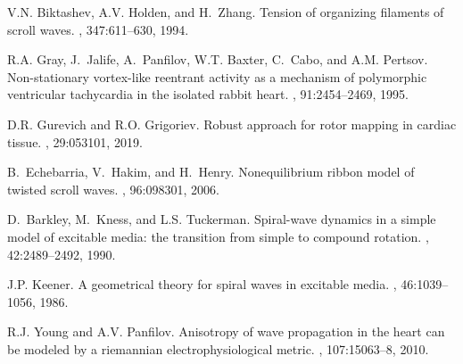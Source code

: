 \documentclass{article}
\begin{document}
\begin{thebibliography}{10}
V.N. Biktashev, A.V. Holden, and H.~Zhang.
\newblock Tension of organizing filaments of scroll waves.
, 347:611--630, 1994.

R.A. Gray, J.~Jalife, A.~Panfilov, W.T. Baxter, C.~Cabo, and A.M. Pertsov.
\newblock Non-stationary vortex-like reentrant activity as a mechanism of
  polymorphic ventricular tachycardia in the isolated rabbit heart.
, 91:2454--2469, 1995.

D.R. Gurevich and R.O. Grigoriev.
\newblock Robust approach for rotor mapping in cardiac tissue.
, 29:053101, 2019.

B.~Echebarria, V.~Hakim, and H.~Henry.
\newblock Nonequilibrium ribbon model of twisted scroll waves.
, 96:098301, 2006.

D.~Barkley, M.~Kness, and L.S. Tuckerman.
\newblock Spiral-wave dynamics in a simple model of excitable media: the
  transition from simple to compound rotation.
, 42:2489--2492, 1990.

J.P. Keener.
\newblock A geometrical theory for spiral waves in excitable media.
, 46:1039--1056, 1986.

R.J. Young and A.V. Panfilov.
\newblock Anisotropy of wave propagation in the heart can be modeled by a
  riemannian electrophysiological metric.
, 107:15063--8, 2010.

\end{thebibliography}
\end{document}
